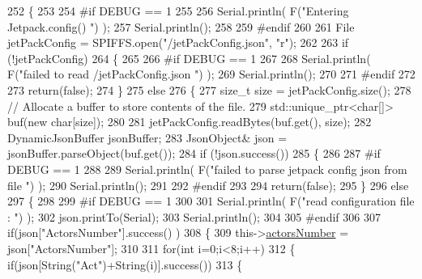 \begin{DoxyCode}
252 \{
253 
254 \textcolor{preprocessor}{#if DEBUG == 1 }
255 
256     Serial.println( F(\textcolor{stringliteral}{"Entering Jetpack.config() "}) );
257     Serial.println();
258 
259 \textcolor{preprocessor}{#endif}
260 
261     File jetPackConfig = SPIFFS.open(\textcolor{stringliteral}{"/jetPackConfig.json"}, \textcolor{stringliteral}{"r"});
262 
263     \textcolor{keywordflow}{if} (!jetPackConfig) 
264     \{
265 
266 \textcolor{preprocessor}{    #if DEBUG == 1 }
267 
268         Serial.println( F(\textcolor{stringliteral}{"failed to read /jetPackConfig.json "}) );
269         Serial.println();
270 
271 \textcolor{preprocessor}{    #endif}
272 
273         \textcolor{keywordflow}{return}(\textcolor{keyword}{false});
274     \}
275     \textcolor{keywordflow}{else}
276     \{
277         \textcolor{keywordtype}{size\_t} size = jetPackConfig.size();
278         \textcolor{comment}{// Allocate a buffer to store contents of the file.}
279         std::unique\_ptr<char[]> buf(\textcolor{keyword}{new} \textcolor{keywordtype}{char}[size]);
280 
281         jetPackConfig.readBytes(buf.get(), size);
282         DynamicJsonBuffer jsonBuffer;
283         JsonObject& json = jsonBuffer.parseObject(buf.get());
284         \textcolor{keywordflow}{if} (!json.success()) 
285         \{
286         
287 \textcolor{preprocessor}{        #if DEBUG == 1 }
288 
289             Serial.println( F(\textcolor{stringliteral}{"failed to parse jetpack config json from file "}) );
290             Serial.println();
291 
292 \textcolor{preprocessor}{        #endif}
293 
294             \textcolor{keywordflow}{return}(\textcolor{keyword}{false});
295         \} 
296         \textcolor{keywordflow}{else}
297         \{ 
298         
299 \textcolor{preprocessor}{        #if DEBUG == 1 }
300 
301             Serial.println( F(\textcolor{stringliteral}{"read configuration file : "}) );
302             json.printTo(Serial);
303             Serial.println();
304         
305 \textcolor{preprocessor}{        #endif}
306   
307             \textcolor{keywordflow}{if}(json[\textcolor{stringliteral}{"ActorsNumber"}].success() )
308             \{
309                 this->\hyperlink{classJetpack_a52c86319cb3f7f1ab744a64db18a7ba5}{actorsNumber} = json[\textcolor{stringliteral}{"ActorsNumber"}]; 
310             
311                 \textcolor{keywordflow}{for}(\textcolor{keywordtype}{int} i=0;i<8;i++)
312                 \{   \textcolor{keywordflow}{if}(json[String(\textcolor{stringliteral}{"Act"})+String(i)].success())
313                     \{

\end{DoxyCode}
